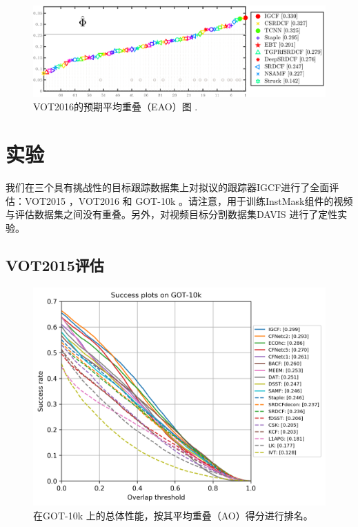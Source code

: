 \begin{figure}
    \centering
    \includegraphics[width=1.0\textwidth]{Img/IGCF/vot/eao_rank_vot2016.png}
    \caption{VOT2016的预期平均重叠（EAO）图 \cite{Kristan2016TheVO}.}
    \label{fig:vot16}
\end{figure}

\section{实验}
我们在三个具有挑战性的目标跟踪数据集上对拟议的跟踪器IGCF进行了全面评估：VOT2015 \cite{Kristan2015TheVO}，VOT2016 \cite{Kristan2016TheVO} 和 GOT-10k \cite{GOT-10k}。请注意，用于训练InstMask组件的视频与评估数据集之间没有重叠。另外，对视频目标分割数据集DAVIS \cite{Perazzi2016}进行了定性实验。
\subsection{VOT2015评估}

\begin{figure}
    \centering
    \includegraphics[width=1.0\textwidth]{Img/IGCF/got10k/success_plot.png}
    \caption{在GOT-10k \cite{GOT-10k}上的总体性能，按其平均重叠（AO）得分进行排名。}
    \label{fig:got10k}
\end{figure}

